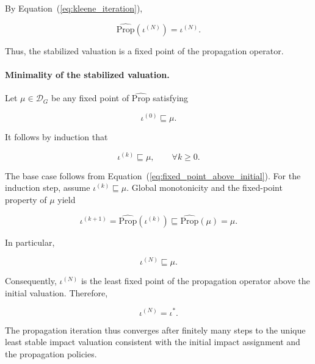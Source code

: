 \documentclass[10pt]{article}
\begin{document}
By Equation~(\ref{eq:kleene_iteration}),

\begin{equation}
	\widehat{\mathrm{Prop}}
	\!\left(
	\iota^{(N)}
	\right)
	=
	\iota^{(N)}.
	\label{eq:iteration_fixed_point}
\end{equation}

Thus, the stabilized valuation is a fixed point of the propagation operator.

\paragraph{Minimality of the stabilized valuation.}

Let $\mu\in\mathcal D_G$ be any fixed point of
$\widehat{\mathrm{Prop}}$ satisfying

\begin{equation}
	\iota^{(0)}
	\sqsubseteq
	\mu.
	\label{eq:fixed_point_above_initial}
\end{equation}

It follows by induction that

\begin{equation}
	\iota^{(k)}
	\sqsubseteq
	\mu,
	\qquad
	\forall k\geq 0.
	\label{eq:iteration_below_fixed_point}
\end{equation}

The base case follows from
Equation~(\ref{eq:fixed_point_above_initial}). For the induction step, assume
$\iota^{(k)}\sqsubseteq\mu$. Global monotonicity and the fixed-point property of
$\mu$ yield

\begin{equation}
	\iota^{(k+1)}
	=
	\widehat{\mathrm{Prop}}
	\!\left(
	\iota^{(k)}
	\right)
	\sqsubseteq
	\widehat{\mathrm{Prop}}(\mu)
	=
	\mu.
	\label{eq:minimality_induction_step}
\end{equation}

In particular,

\begin{equation}
	\iota^{(N)}
	\sqsubseteq
	\mu.
	\label{eq:stabilized_minimality}
\end{equation}

Consequently, $\iota^{(N)}$ is the least fixed point of the propagation
operator above the initial valuation. Therefore,

\begin{equation}
	\iota^{(N)}
	=
	\iota^{*}.
	\label{eq:iteration_lfp}
\end{equation}

The propagation iteration thus converges after finitely many steps to the
unique least stable impact valuation consistent with the initial impact
assignment and the propagation policies.
\end{document}
